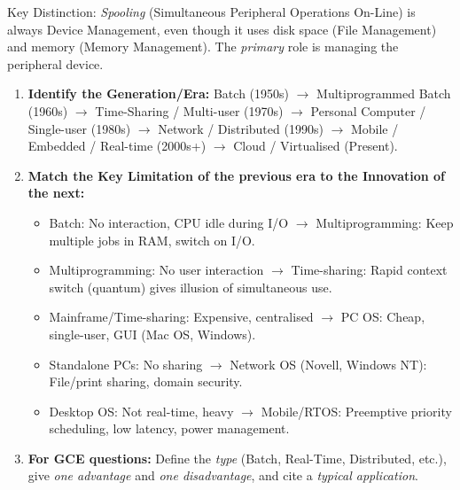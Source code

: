 \documentclass[11pt]{article}
\newcommand{\cle}[1]{{\popxbold\color{popdark}#1}}
\begin{document}
\begin{exoresolu}
\cle{Key Distinction:} \emph{Spooling} (Simultaneous Peripheral Operations On-Line) is always Device Management, even though it uses disk space (File Management) and memory (Memory Management). The \emph{primary} role is managing the peripheral device.
\end{exoresolu}

\begin{methode}
\begin{enumerate}
\item \textbf{Identify the Generation/Era:} Batch (1950s) $\rightarrow$ Multiprogrammed Batch (1960s) $\rightarrow$ Time-Sharing / Multi-user (1970s) $\rightarrow$ Personal Computer / Single-user (1980s) $\rightarrow$ Network / Distributed (1990s) $\rightarrow$ Mobile / Embedded / Real-time (2000s+) $\rightarrow$ Cloud / Virtualised (Present).
\item \textbf{Match the \cle{Key Limitation} of the previous era to the \cle{Innovation} of the next:}
\begin{itemize}
    \item Batch: No interaction, CPU idle during I/O $\rightarrow$ Multiprogramming: Keep multiple jobs in RAM, switch on I/O.
    \item Multiprogramming: No user interaction $\rightarrow$ Time-sharing: Rapid context switch (quantum) gives illusion of simultaneous use.
    \item Mainframe/Time-sharing: Expensive, centralised $\rightarrow$ PC OS: Cheap, single-user, GUI (Mac OS, Windows).
    \item Standalone PCs: No sharing $\rightarrow$ Network OS (Novell, Windows NT): File/print sharing, domain security.
    \item Desktop OS: Not real-time, heavy $\rightarrow$ Mobile/RTOS: Preemptive priority scheduling, low latency, power management.
\end{itemize}
\item \textbf{For GCE questions:} Define the \emph{type} (Batch, Real-Time, Distributed, etc.), give \emph{one advantage} and \emph{one disadvantage}, and cite a \emph{typical application}.
\end{enumerate}
\end{methode}
\end{document}

